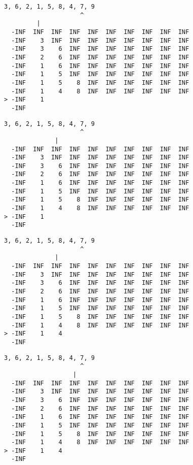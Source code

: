 { \begin{verbatim}
3, 6, 2, 1, 5, 8, 4, 7, 9
                     ^
         |
  -INF  INF  INF  INF  INF  INF  INF  INF  INF  INF
  -INF    3  INF  INF  INF  INF  INF  INF  INF  INF
  -INF    3    6  INF  INF  INF  INF  INF  INF  INF
  -INF    2    6  INF  INF  INF  INF  INF  INF  INF
  -INF    1    6  INF  INF  INF  INF  INF  INF  INF
  -INF    1    5  INF  INF  INF  INF  INF  INF  INF
  -INF    1    5    8  INF  INF  INF  INF  INF  INF
  -INF    1    4    8  INF  INF  INF  INF  INF  INF
> -INF    1                                        
  -INF                                             
\end{verbatim} }

{ \begin{verbatim}
3, 6, 2, 1, 5, 8, 4, 7, 9
                     ^
              |
  -INF  INF  INF  INF  INF  INF  INF  INF  INF  INF
  -INF    3  INF  INF  INF  INF  INF  INF  INF  INF
  -INF    3    6  INF  INF  INF  INF  INF  INF  INF
  -INF    2    6  INF  INF  INF  INF  INF  INF  INF
  -INF    1    6  INF  INF  INF  INF  INF  INF  INF
  -INF    1    5  INF  INF  INF  INF  INF  INF  INF
  -INF    1    5    8  INF  INF  INF  INF  INF  INF
  -INF    1    4    8  INF  INF  INF  INF  INF  INF
> -INF    1                                        
  -INF                                             
\end{verbatim} }

{ \begin{verbatim}
3, 6, 2, 1, 5, 8, 4, 7, 9
                     ^
              |
  -INF  INF  INF  INF  INF  INF  INF  INF  INF  INF
  -INF    3  INF  INF  INF  INF  INF  INF  INF  INF
  -INF    3    6  INF  INF  INF  INF  INF  INF  INF
  -INF    2    6  INF  INF  INF  INF  INF  INF  INF
  -INF    1    6  INF  INF  INF  INF  INF  INF  INF
  -INF    1    5  INF  INF  INF  INF  INF  INF  INF
  -INF    1    5    8  INF  INF  INF  INF  INF  INF
  -INF    1    4    8  INF  INF  INF  INF  INF  INF
> -INF    1    4                                   
  -INF                                             
\end{verbatim} }

{ \begin{verbatim}
3, 6, 2, 1, 5, 8, 4, 7, 9
                     ^
                   |
  -INF  INF  INF  INF  INF  INF  INF  INF  INF  INF
  -INF    3  INF  INF  INF  INF  INF  INF  INF  INF
  -INF    3    6  INF  INF  INF  INF  INF  INF  INF
  -INF    2    6  INF  INF  INF  INF  INF  INF  INF
  -INF    1    6  INF  INF  INF  INF  INF  INF  INF
  -INF    1    5  INF  INF  INF  INF  INF  INF  INF
  -INF    1    5    8  INF  INF  INF  INF  INF  INF
  -INF    1    4    8  INF  INF  INF  INF  INF  INF
> -INF    1    4                                   
  -INF                                             
\end{verbatim} }

